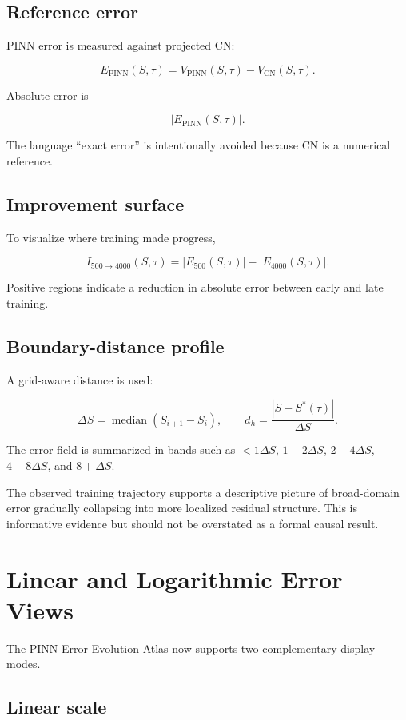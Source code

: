 \documentclass[11pt,a4paper]{article}
\begin{document}
\subsection{Reference error}

PINN error is measured against projected CN:

\[
E_{\mathrm{PINN}}(S,\tau)
=V_{\mathrm{PINN}}(S,\tau)-V_{\mathrm{CN}}(S,\tau).
\]

Absolute error is

\[
|E_{\mathrm{PINN}}(S,\tau)|.
\]

The language ``exact error'' is intentionally avoided because CN is a numerical reference.

\subsection{Improvement surface}

To visualize where training made progress,

\[
I_{500\to4000}(S,\tau)
=|E_{500}(S,\tau)|-|E_{4000}(S,\tau)|.
\]

Positive regions indicate a reduction in absolute error between early and late training.

\subsection{Boundary-distance profile}

A grid-aware distance is used:

\[
\Delta S=\operatorname{median}(S_{i+1}-S_i),
\qquad
 d_h=\frac{|S-S^*(\tau)|}{\Delta S}.
\]

The error field is summarized in bands such as \(<1\Delta S\), \(1-2\Delta S\), \(2-4\Delta S\), \(4-8\Delta S\), and \(8+\Delta S\).

The observed training trajectory supports a descriptive picture of broad-domain error gradually collapsing into more localized residual structure. This is informative evidence but should not be overstated as a formal causal result.

\section{Linear and Logarithmic Error Views}

The PINN Error-Evolution Atlas now supports two complementary display modes.

\subsection{Linear scale}
\end{document}
